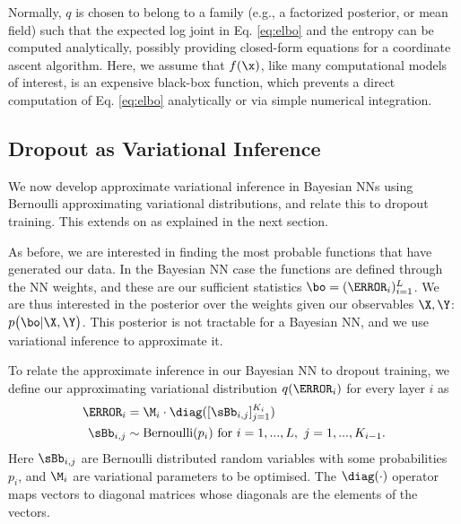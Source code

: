 Normally, $q$ is chosen to belong to a family (e.g., a factorized posterior, or mean field) such that the expected log joint in Eq. \ref{eq:elbo} and the entropy can be computed analytically, possibly providing closed-form equations for a coordinate ascent algorithm. Here, we assume that $f(\x)$, like many computational models of interest, is an expensive black-box function, which prevents a direct computation of Eq. \ref{eq:elbo} analytically or via simple numerical integration.

\subsection{Dropout as Variational Inference}

We now develop approximate variational inference in Bayesian NNs using Bernoulli approximating variational distributions, and relate this to dropout training. This extends on \citep{Gal2015Dropout} as explained in the next section. 

As before, we are interested in finding the most probable functions that have generated our data. In the Bayesian NN case the functions are defined through the NN weights, and these are our sufficient statistics $\bo = (\W_i)_{i=1}^L$. We are thus interested in the posterior over the weights given our observables $\X, \Y$: $p \big( \bo | \X, \Y \big)$. 
This posterior is not tractable for a Bayesian NN, and we use variational inference to approximate it. %

To relate the approximate inference in our Bayesian NN to dropout training, we define our approximating variational distribution $q(\W_i)$ for every layer $i$ as 
\begin{align}\label{eq:approx-dist}
\W_i &= \M_i \cdot \diag([\sBb_{i,j}]_{j=1}^{K_i}) \\
\sBb_{i,j} &\sim \text{Bernoulli}(p_i) \text{ for } i = 1, ..., L, ~ j = 1, ..., K_{i-1}. \notag
\end{align}
Here $\sBb_{i,j}$ are Bernoulli distributed random variables with some probabilities $p_i$, and $\M_i$ are variational parameters to be optimised.
The $\diag(\cdot)$ operator maps vectors to diagonal matrices whose diagonals are the elements of the vectors. 

